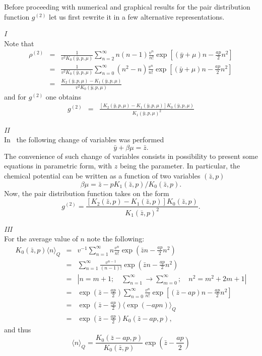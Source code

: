 Before proceeding with numerical and graphical results for the pair distribution function $g^{(2)}$ let us first rewrite it in a few alternative representations.

{\it I}\\
Note that
\begin{eqnarray*}
	\rho^{(2)} & = & \frac{1}{v^2 K_0(\bar{y}, p, \mu)} \sum_{n=2}^{\infty} n(n-1) \frac{v^n}{n!} \exp\left[(\bar{y} + \mu)n - \frac{a p}{2} n^2\right]
	\\
	& = & \frac{1}{v^2 K_0(\bar{y}, p, \mu)} \sum_{n=0}^{\infty} (n^2 - n) \frac{v^n}{n!} \exp\left[(\bar{y} + \mu)n - \frac{a p}{2} n^2\right]
	\\
	& = & \frac{K_2(\bar{y}, p, \mu) - K_1(\bar{y}, p, \mu)}{v^2 K_0(\bar{y}, p, \mu)}
\end{eqnarray*}
and for $g^{(2)}$ one obtains
\begin{eqnarray}
	g^{(2)} & = & \frac{\left[K_2(\bar{y}, p, \mu) - K_1(\bar{y}, p, \mu)\right] K_0(\bar{y}, p, \mu)}{K_1(\bar{y}, p, \mu)^2}
\end{eqnarray}

{\it II}\\
In~\cite{MpkDob2022} the following change of variables was performed
\begin{equation*}
	\bar{y} + \beta\mu = \bar{z}.
\end{equation*}
The convenience of such change of variables consists in possibility to present some equations in parametric form, with $z$ being the parameter. In particular, the chemical potential can be written as a function of two variables $(\bar{z}, p)$
\begin{equation*}
	\beta\mu = \bar{z} - p K_1(\bar{z},p)/K_0(\bar{z},p).
\end{equation*}
Now, the pair distribution function takes on the form
\begin{equation}
	g^{(2)} = \frac{\left[K_2(\bar{z}, p) - K_1(\bar{z}, p)\right] K_0(\bar{z}, p)}{K_1(\bar{z}, p)^2}.
\end{equation}

{\it III} \\
For the average value of $n$ note the following:
\begin{eqnarray*}
	K_0(\bar{z}, p) \langle n \rangle_Q & = & 
	v^{-1} \sum_{n=1}^{\infty} n \frac{v^n}{n!} \exp(\bar{z}n - \frac{ap}{2}n^2)
	\\
	& = & \sum_{n=1}^{\infty} \frac{v^{n-1}}{(n-1)!} \exp(\bar{z}n - \frac{ap}{2}n^2)
	\\
	& = & \left| n=m+1; \quad \sum_{n=1}^{\infty} \rightarrow \sum_{m=0}^{\infty}; \quad n^2 = m^2 + 2m + 1 \right|
	\\
	& = & \exp(\bar{z} - \frac{ap}{2}) \sum_{n=0}^{\infty} \frac{v^n}{n!} \exp\left[(\bar{z} - ap)n - \frac{ap}{2}n^2 \right]
	\\
	& = & \exp(\bar{z} - \frac{ap}{2}) \langle \exp(-apn) \rangle_Q
	\\
	& = & \exp(\bar{z} - \frac{ap}{2}) K_0 (\bar{z} - ap, p),
\end{eqnarray*}
and thus
\begin{equation*}
	\langle n \rangle_Q = \frac{K_0(\bar{z} - ap, p)}{K_0(\bar{z}, p)} \exp(\bar{z} - \frac{ap}{2})
\end{equation*}

